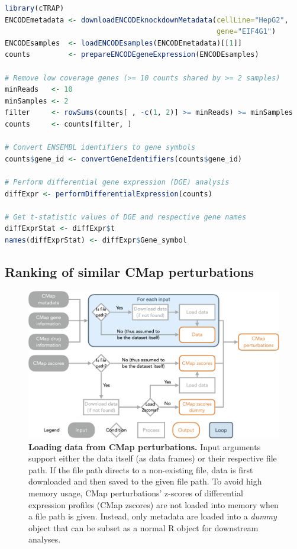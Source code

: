 \begin{lstlisting}[caption=Code to obtain example dataset \texttt{diffExprStat}.,language=R,label={lst:diffExprStat}]
library(cTRAP)
ENCODEmetadata <- downloadENCODEknockdownMetadata(cellLine="HepG2",
                                                  gene="EIF4G1")
ENCODEsamples  <- loadENCODEsamples(ENCODEmetadata)[[1]]
counts         <- prepareENCODEgeneExpression(ENCODEsamples)

# Remove low coverage genes (>= 10 counts shared by >= 2 samples)
minReads   <- 10
minSamples <- 2
filter     <- rowSums(counts[ , -c(1, 2)] >= minReads) >= minSamples
counts     <- counts[filter, ]

# Convert ENSEMBL identifiers to gene symbols
counts$gene_id <- convertGeneIdentifiers(counts$gene_id)

# Perform differential gene expression (DGE) analysis
diffExpr <- performDifferentialExpression(counts)

# Get t-statistic values of DGE and respective gene names
diffExprStat <- diffExpr$t
names(diffExprStat) <- diffExpr$Gene_symbol
\end{lstlisting}

\subsection{Ranking of similar CMap perturbations}

\begin{figure}[!b]
  \includegraphics[width=.8\textwidth]{images/ctrap/cmap-perturbations}
  \centering
  \caption[Loading data from CMap perturbations]{\textbf{Loading data from CMap perturbations.} Input arguments support either the data itself (as data frames) or their respective file path. If the file path directs to a non-existing file,  data is first downloaded and then saved to the given file path. To avoid high memory usage, CMap perturbations' z-scores of differential expression profiles (CMap zscores) are not loaded into memory when a file path is given. Instead, only metadata are loaded into a \emph{dummy} object that can be subset as a normal R object for downstream analyses.}
  \label{fig:ctrap-cmap-perturbations}
\end{figure}

